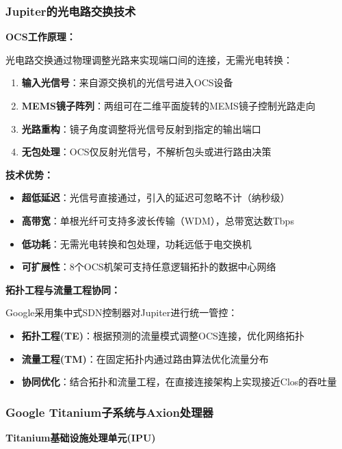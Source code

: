 \subsubsection{Jupiter的光电路交换技术}

\textbf{OCS工作原理：}

光电路交换通过物理调整光路来实现端口间的连接，无需光电转换：

\begin{enumerate}
    \item \textbf{输入光信号}：来自源交换机的光信号进入OCS设备
    \item \textbf{MEMS镜子阵列}：两组可在二维平面旋转的MEMS镜子控制光路走向
    \item \textbf{光路重构}：镜子角度调整将光信号反射到指定的输出端口
    \item \textbf{无包处理}：OCS仅反射光信号，不解析包头或进行路由决策
\end{enumerate}

\textbf{技术优势：}
\begin{itemize}
    \item \textbf{超低延迟}：光信号直接通过，引入的延迟可忽略不计（纳秒级）
    \item \textbf{高带宽}：单根光纤可支持多波长传输（WDM），总带宽达数Tbps
    \item \textbf{低功耗}：无需光电转换和包处理，功耗远低于电交换机
    \item \textbf{可扩展性}：8个OCS机架可支持任意逻辑拓扑的数据中心网络
\end{itemize}

\textbf{拓扑工程与流量工程协同：}

Google采用集中式SDN控制器对Jupiter进行统一管控：

\begin{itemize}
    \item \textbf{拓扑工程(TE)}：根据预测的流量模式调整OCS连接，优化网络拓扑
    \item \textbf{流量工程(TM)}：在固定拓扑内通过路由算法优化流量分布
    \item \textbf{协同优化}：结合拓扑和流量工程，在直接连接架构上实现接近Clos的吞吐量
\end{itemize}

\subsubsection{Google Titanium子系统与Axion处理器}

\textbf{Titanium基础设施处理单元(IPU)}

